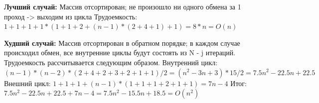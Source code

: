\documentclass{report}
\begin{document}
 
\textbf{Лучший случай:} Массив отсортирован; не произошло ни одного обмена за 1 проход -> выходим из цикла \newline
Трудоемкость:  $1 + 1 + 1 + 1 * (1 + 1 + 2 + (n - 1) * (2 + 4 + 1) + 1) = 8 * n = O(n)$

\textbf{Худший случай:}  Массив отсортирован в обратном порядке; в каждом случае происходил обмен, все внутренние циклы будут состоять из N - j итераций.\newline
Трудоемкость рассчитывается следующим образом. 
\newline
Внутренний цикл: $(n - 1) * (n - 2) * (2 + 4 + 2 + 3 + 2 + 1 + 1) / 2 = (n^2 -3n + 3) * 15 / 2 = 7.5n^2 - 22.5n + 22.5$
\newline
Внешний цикл: $1 + 1 + 1 + (n - 1) * (1 + 1 + 1 + 2 + 1 + 1) = 7n - 4$
\newline
Итог: $7.5 n^2 - 22.5n + 22.5 + 7n - 4 = 7.5n^2 - 15.5n + 18.5 = O(n ^ 2)$
\newline
\newline
\newline
\end{document}
